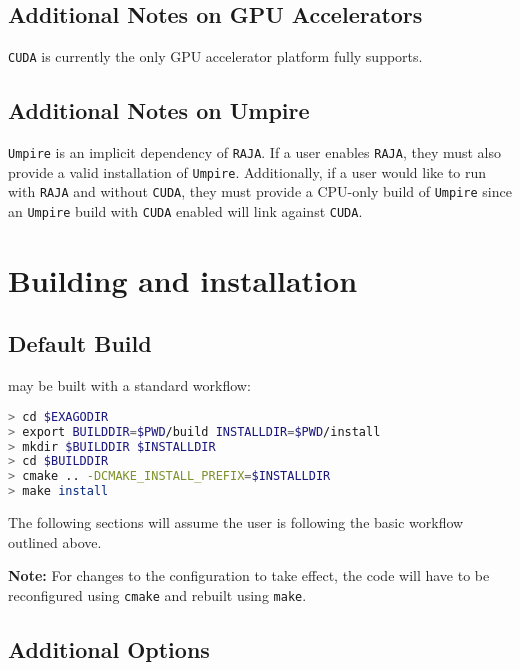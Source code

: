 \subsection{Additional Notes on GPU Accelerators}

\texttt{CUDA} is currently the only GPU accelerator platform \exago fully supports.

\subsection{Additional Notes on Umpire}

\texttt{Umpire} is an implicit dependency of \texttt{RAJA}.
If a user enables \texttt{RAJA}, they must also provide a valid installation of \texttt{Umpire}.
Additionally, if a user would like to run \exago with \texttt{RAJA} and without \texttt{CUDA}, they must provide a CPU-only build of \texttt{Umpire} since an \texttt{Umpire} build with \texttt{CUDA} enabled will link against \texttt{CUDA}.

\section{Building and installation}
\label{sec:building_and_installation}

\subsection{Default Build}

\exago may be built with a standard \cmake workflow:

\begin{lstlisting}[language=bash,caption={Example \cmake workflow}]
> cd $EXAGODIR
> export BUILDDIR=$PWD/build INSTALLDIR=$PWD/install
> mkdir $BUILDDIR $INSTALLDIR
> cd $BUILDDIR
> cmake .. -DCMAKE_INSTALL_PREFIX=$INSTALLDIR
> make install
\end{lstlisting}

\noindent
The following sections will assume the user is following the basic workflow outlined above.

\textbf{Note:} For changes to the \cmake configuration to take effect, the code will have to be reconfigured using \texttt{cmake} and rebuilt using \texttt{make}.

\subsection{Additional Options}

